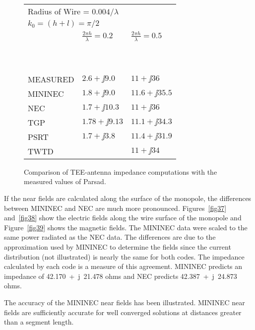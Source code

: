 \documentclass[12pt]{article}
\begin{document}
\begin{figure}[h]
\begin{tabular}{lll}
\multicolumn{2}{l}{\quad Radius of Wire = $0.004/\lambda$}  \\
\multicolumn{2}{l}{\quad $k_0 = (h + l) = \pi/2$}           \\
         & $\frac{2\pi h}{\lambda}=0.2$ & $\frac{2\pi h}{\lambda}=0.5$ \\
\ \\
\hline
\ \\
MEASURED & $2.6+\jj9.0$                 & $11+\jj36$      \\
MININEC  & $1.8+\jj9.0$                 & $11.6+\jj35.5$  \\
NEC      & $1.7+\jj10.3$                & $11+\jj36$      \\
TGP      & $1.78+\jj9.13$               & $11.1+\jj34.3$  \\
PSRT     & $1.7+\jj3.8$                 & $11.4+\jj31.9$  \\
TWTD     &                              & $11+\jj34$      \\
\end{tabular}
\caption{Comparison of TEE-antenna impedance computations with the
measured values of Parsad.}
\label{fig31}
\end{figure}

If the near fields are calculated along the surface of the monopole, the
differences between MININEC and NEC are much more pronounced.
Figures~\ref{fig37} and~\ref{fig38} show the electric fields along the
wire surface of the monopole and Figure~\ref{fig39} shows the magnetic
fields. The MININEC data were scaled to the same power radiated as the
NEC data. The differences are due to the approximation used by MININEC
to determine the fields since the current distribution (not illustrated)
is nearly the same for both codes. The impedance calculated by each code
is a measure of this agreement. MININEC predicts an impedance of
42.170~+~j~21.478 ohms and NEC predicts 42.387~+~j~24.873 ohms.

The accuracy of the MININEC near fields has been illustrated. MININEC
near fields are sufficiently accurate for well converged solutions at
distances greater than a segment length.
\end{document}
